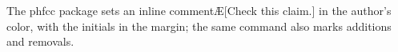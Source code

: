 \documentclass[11pt]{article}\usepackage[paperwidth=14cm,paperheight=7cm,left=1cm,right=3.6cm,top=1cm,bottom=1cm,marginparwidth=2.6cm,marginparsep=3mm]{geometry}\pagestyle{empty}
\begin{document}
The phfcc package sets an inline comment\AE[Check this claim.] in the author's color, with the initials in the margin; the same command also marks additions and removals.
\end{document}

